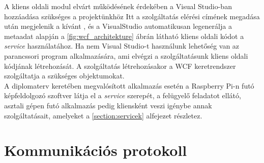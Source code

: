 A kliens oldali modul elvárt működésének érdekében a Visual Studio-ban  hozzáadása szükséges a projektünkhöz Itt a szolgáltatás elérési címének megadása után megjelenik a kívánt , és a VisualStudio automatikusan legenerálja a metaadat alapján a \ref{fig:wcf_architekture} ábrán látható kliens oldali kódot a \emph{service} használatához. Ha nem Visual Studio-t használunk lehetőség van az  parancssori program alkalmazására, ami elvégzi a szolgáltatásunk kliens oldali kódjának létrehozását. A szolgáltatás létrehozásakor a WCF keretrendszer szolgáltatja a szükséges objektumokat.\\

A diplomaterv keretében megvalósított alkalmazás esetén a Raspberry Pi-n futó képfeldolgozó szoftver látja el a  \emph{service} szerepét, a felügyelő feladatot ellátó, asztali gépen futó alkalmazás pedig kliensként veszi igénybe annak szolgáltatásait, amelyeket a \ref{section:servicek} alfejezet részletez.

\section{Kommunikációs protokoll}


